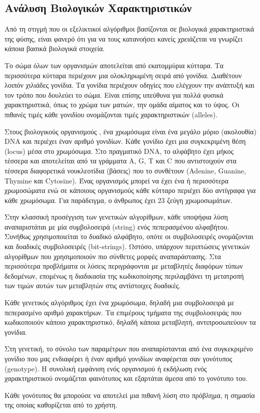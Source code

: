 \subsection{Ανάλυση Βιολογικών Χαρακτηριστικών}
Από τη στιγμή που οι εξελικτικοί αλγόριθμοι βασίζονται σε βιολογικά χαρακτηριστικά της φύσης, είναι φανερό ότι για να τους κατανοήσει κανείς χρειάζεται να γνωρίζει κάποια βασικά βιολογικά στοιχεία.

Το σώμα όλων των οργανισμών αποτελείται από εκατομμύρια κύτταρα. Τα περισσότερα κύτταρα περιέχουν μια ολοκληρωμένη σειρά από γονίδια. Διαθέτουν λοιπόν χιλιάδες γονίδια. Τα γονίδια περιέχουν οδηγίες που ελέγχουν την ανάπτυξή και τον τρόπο που δουλεύει το σώμα. Είναι επίσης υπεύθυνα για πολλά φυσικά χαρακτηριστικά, όπως το χρώμα των ματιών, την ομάδα αίματος και το ύψος. Οι πιθανές τιμές κάθε γονιδίου ονομάζονται τιμές χαρακτηριστικών (alleles).

Στους βιολογικούς οργανισμούς \cite{Vlaxavas}, ένα χρωμόσωμα είναι ένα μεγάλο μόριο (ακολουθία) DNA και περιέχει έναν αριθμό γονιδίων. Κάθε γονίδιο έχει μια συγκεκριμένη θέση (locus) μέσα στο χρωμόσωμα. Στο πραγματικό DNA, το αλφάβητο έχει μήκος τέσσερα και αποτελείται από τα γράμματα A, G, T και C που αντιστοιχούν στα τέσσερα διαφορετικά νουκλεοτίδια (βάσεις) που το συνθέτουν (Adenine, Guanine, Thymine και Cytosine). Ένας οργανισμός μπορεί να έχει ένα ή περισσότερα χρωμοσώματα ενώ σε κάποιους οργανισμούς κάθε κύτταρο περιέχει δύο αντίγραφα για κάθε χρωμόσωμα. Για παράδειγμα, ο άνθρωπος έχει 23 ζεύγη χρωμοσωμάτων.

Στην κλασσική προσέγγιση των γενετικών αλγορίθμων, κάθε υποψήφια λύση αναπαριστάται με μία συμβολοσειρά (string) ενός πεπερασμένου αλφαβήτου. Συνήθως χρησιμοποιείται το δυαδικό αλφάβητο, οπότε οι συμβολοσειρές ονομάζονται και δυαδικές συμβολοσειρές (bit-strings). Ωστόσο, υπάρχουν περιπτώσεις γενετικών αλγορίθμων που χρησιμοποιούν πιο σύνθετες μορφές αναπαράστασης. Στα περισσότερα προβλήματα οι λύσεις περιγράφονται με μεταβλητές διαφόρων τύπων δεδομένων, επομένως η διαδικασία της κωδικοποίησης περιλαμβάνει τη μετατροπή των τιμών αυτών των μεταβλητών στις αντίστοιχες δυαδικές.

Κάθε γενετικός αλγόριθμος έχει ένα χρωμόσωμα, δηλαδή μια συμβολοσειρά με πεπερασμένο αριθμό χαρακτήρων. Τα επιμέρους τμήματα της συμβολοσειράς που κωδικοποιούν κάποιο χαρακτηριστικό, δηλαδή κάποια μεταβλητή, αντιπροσωπεύουν τα γονίδια.

Στη γενετική, το σύνολο των παραμέτρων που αναπαρίστανται από ένα συγκεκριμένο γονίδιο που μας ενδιαφέρει ή έναν αριθμό γονιδίων αναφέρεται σαν γονότυπος (genotype). Η συνολική εμφάνιση ενός οργανισμού ή εκδήλωση ενός χαρακτηριστικού ονομάζεται φαινότυπος και εξαρτάται άμεσα από το γονότυπο του.

Κάθε γονότυπος θα μπορούσε να αποτελεί μια πιθανή λύση στο πρόβλημα, η σημασία της οποίας καθορίζεται από το χρήστη. 